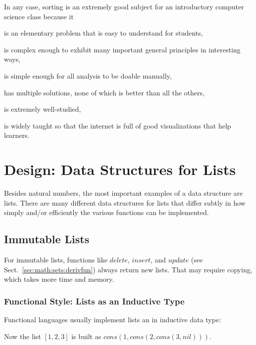 In any case, sorting is an extremely good subject for an introductory computer science class because it
\begin{compactitem}
 \item is an elementary problem that is easy to understand for students,
 \item is complex enough to exhibit many important general principles in interesting ways,
 \item is simple enough for all analysis to be doable manually,
 \item has multiple solutions, none of which is better than all the others,
 \item is extremely well-studied,
 \item is widely taught so that the internet is full of good visualizations that help learners.
\end{compactitem}


\section{Design: Data Structures for Lists}\label{sec:ad:list:ds}


Besides natural numbers, the most important examples of a data structure are lists.
There are many different data structures for lists that differ subtly in how simply and/or efficiently the various functions can be implemented.

\subsection{Immutable Lists}

For immutable lists, functions like $delete$, $insert$, and $update$ (see Sect.~\ref{sec:math:sets:derivfun}) always return new lists.
That may require copying, which takes more time and memory.

\subsubsection{Functional Style: Lists as an Inductive Type}

Functional languages usually implement lists an in inductive data type:
\begin{acode}
\end{acode}
Now the list $[1,2,3]$ is built as $cons(1,cons(2,cons(3,nil)))$.

